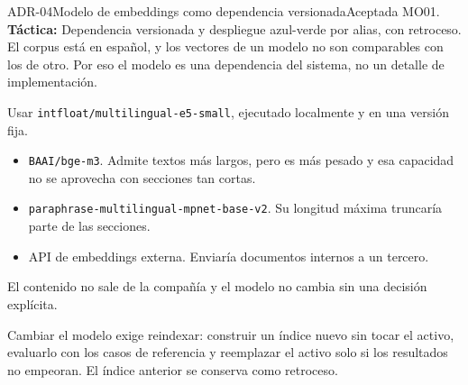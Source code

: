 \begin{adr}{ADR-04}{Modelo de embeddings como dependencia versionada}{Aceptada}
 MO01. \textbf{Táctica:} Dependencia versionada y despliegue azul-verde por alias, con retroceso.
El corpus está en español, y los vectores de un modelo no son comparables con los de otro. Por eso el modelo es una dependencia del sistema, no un detalle de implementación.

Usar \texttt{intfloat/multilingual-e5-small}, ejecutado localmente y en una versión fija.

\begin{itemize}
  \item \texttt{BAAI/bge-m3}. Admite textos más largos, pero es más pesado y esa capacidad no se aprovecha con secciones tan cortas.
  \item \texttt{paraphrase-multilingual-mpnet-base-v2}. Su longitud máxima truncaría parte de las secciones.
  \item API de embeddings externa. Enviaría documentos internos a un tercero.
\end{itemize}

El contenido no sale de la compañía y el modelo no cambia sin una decisión explícita.

Cambiar el modelo exige reindexar: construir un índice nuevo sin tocar el activo, evaluarlo con los casos de referencia y reemplazar el activo solo si los resultados no empeoran. El índice anterior se conserva como retroceso.
\end{adr}

